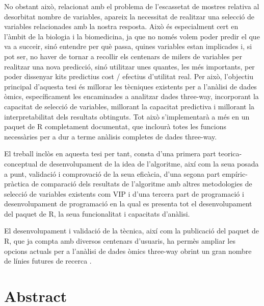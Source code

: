 No obstant això, relacionat amb el problema de l'escassetat de mostres relativa al desorbitat nombre de variables, apareix la necessitat de realitzar una selecció de variables relacionades amb la nostra resposta. Això és especialment cert en l'àmbit de la biologia i la biomedicina, ja que no només volem poder predir el que va a succeir, sinó entendre per què passa, quines variables estan implicades i, si pot ser, no haver de tornar a recollir els centenars de milers de variables per realitzar una nova predicció, sinó utilitzar unes quantes, les més importants, per poder dissenyar kits predictius cost / efectius d'utilitat real. Per això, l'objectiu principal d'aquesta tesi és millorar les tècniques existents per a l'anàlisi de dades òmics, específicament les encaminades a analitzar dades three-way, incorporant la capacitat de selecció de variables, millorant la capacitat predictiva i millorant la interpretabilitat dels resultats obtinguts. Tot això s'implementarà a més en un paquet de R completament documentat, que inclourà totes les funcions necessàries per a dur a terme anàlisis completes de dades three-way.

El treball inclòs en aquesta tesi per tant, consta d'una primera part teorica-conceptual de desenvolupament de la idea de l'algoritme, així com la seua posada a punt, validació i comprovació de la seua eficàcia, d'una segona part empíric-pràctica de comparació dels resultats de l'algoritme amb altres metodologies de selecció de variables existents com VIP i d'una tercera part de programació i desenvolupament de programació en la qual es presenta tot el desenvolupament del paquet de R, la seua funcionalitat i capacitats d'anàlisi.

El desenvolupament i validació de la tècnica, així com la publicació del paquet de R, que ja compta amb diversos centenars d'usuaris, ha permès ampliar les opcions actuals per a l'anàlisi de dades òmics three-way obrint un gran nombre de línies futures de recerca .


\ifEBOOKPDF
	\bigskip
\else
	\vfill
\fi


\chapter*{Abstract}


